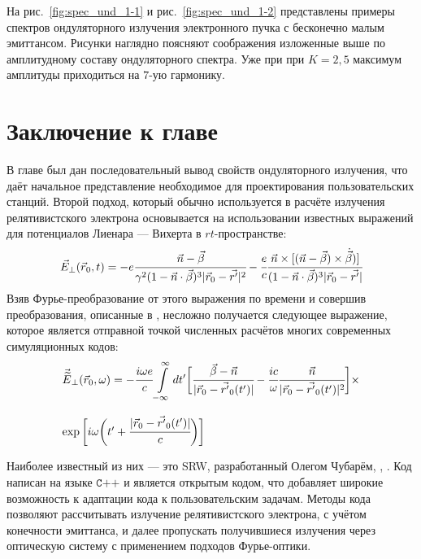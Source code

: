 На рис.~\ref{fig:spec_und_1-1} и рис.~\ref{fig:spec_und_1-2} представлены примеры спектров ондуляторного излучения электронного пучка с бесконечно малым эмиттансом. Рисунки наглядно поясняют соображения изложенные выше по амплитудному составу ондуляторного спектра. Уже при при $K = 2,5$ максимум амплитуды приходиться на $7$-ую гармонику.

\section{Заключение к главе}
В главе был дан последовательный вывод свойств ондуляторного излучения, что даёт начальное представление необходимое для проектирования пользовательских станций. Второй подход, который обычно используется в расчёте излучения релятивистского электрона основывается на использовании известных выражений для потенциалов Лиенара — Вихерта в $rt$-пространстве:
\begin{equation}
	\label{eq:Lienard_Wiechert}
	\vec{{E}}_{\bot}(\vec{r}{_0}, t) = -e \cfrac{\vec{n} - \vec{\beta}}{\gamma^2 (1 - \vec{n}\cdot\vec{\beta})^3 |\vec{r}_{ 0} - \vec{r'}|^2} - \cfrac{e}{c}\cfrac{\vec{n}\times[(\vec{n} - \vec{\beta})\times\dot{\vec{\beta}})]}{(1 - \vec{n}\cdot\vec{\beta})^3 |\vec{r}_{ 0} - \vec{r'}|}
\end{equation}
Взяв Фурье-преобразование от этого выражения по времени и совершив преобразования, описанные в \cite{geloni2006fourier}, несложно получается следующее выражение, которое является отправной точкой численных расчётов многих современных симуляционных кодов:
\begin{equation}
	\label{eq:field_dist_in_integral}
	\begin{array}{lcl}
	\vec{\widetilde{E}}_{\bot}(\vec{r}_0, \omega) = 
	-\cfrac{i\omega e}{c}\displaystyle\int\limits_{-\infty}^{\infty} dt'\bigg[\cfrac{\vec{\beta} - \vec{n}}{|\vec{r}_0 - \vec{r'}_0(t')|} - \cfrac{ic}{\omega}\cfrac{\vec{n}}{|\vec{r}_0 - \vec{r'}_0(t')|^2}\bigg]\times\\
	\\
	\exp\bigg[i\omega\bigg(t' + \cfrac{|\vec{r}_0 - \vec{r'}_0(t')|}{c}\bigg)\bigg]
	\end{array}
\end{equation}

Наиболее известный из них --- это SRW, разработанный Олегом Чубарём, \cite{chubar1998proceedings}, \cite{chubar1998accurate}. Код написан на языке $\texttt{C++}$ и является открытым кодом, что добавляет широкие возможность к адаптации кода к пользовательским задачам. Методы кода позволяют рассчитывать излучение релятивистского электрона, с учётом конечности эмиттанса, и далее пропускать получившиеся излучения через оптическую систему с применением подходов Фурье-оптики.

